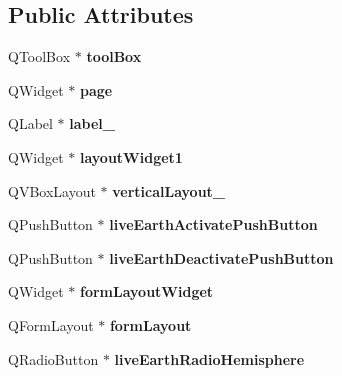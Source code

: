 \subsection*{Public Attributes}
\begin{DoxyCompactItemize}
\item 
\hypertarget{classUi__Extras_ab6d937b70fceb48a3e7eaa028b5af17a}{
QToolBox $\ast$ {\bfseries toolBox}}
\label{classUi__Extras_ab6d937b70fceb48a3e7eaa028b5af17a}

\item 
\hypertarget{classUi__Extras_a4f4b0eb303e7bd48ab30a1d3cd0e0b32}{
QWidget $\ast$ {\bfseries page}}
\label{classUi__Extras_a4f4b0eb303e7bd48ab30a1d3cd0e0b32}

\item 
\hypertarget{classUi__Extras_a0a5ec50ecaca1072b40e7857397ef890}{
QLabel $\ast$ {\bfseries label\_}}
\label{classUi__Extras_a0a5ec50ecaca1072b40e7857397ef890}

\item 
\hypertarget{classUi__Extras_afa6756d7678bcf68325320b8d0260551}{
QWidget $\ast$ {\bfseries layoutWidget1}}
\label{classUi__Extras_afa6756d7678bcf68325320b8d0260551}

\item 
\hypertarget{classUi__Extras_a20949d17f93ae9a7fd7a3f2cf309ccad}{
QVBoxLayout $\ast$ {\bfseries verticalLayout\_}}
\label{classUi__Extras_a20949d17f93ae9a7fd7a3f2cf309ccad}

\item 
\hypertarget{classUi__Extras_ac6fd999821ea077a5a9fb543acc16fd4}{
QPushButton $\ast$ {\bfseries liveEarthActivatePushButton}}
\label{classUi__Extras_ac6fd999821ea077a5a9fb543acc16fd4}

\item 
\hypertarget{classUi__Extras_a0591653135ec37cba2db9a7cebc06393}{
QPushButton $\ast$ {\bfseries liveEarthDeactivatePushButton}}
\label{classUi__Extras_a0591653135ec37cba2db9a7cebc06393}

\item 
\hypertarget{classUi__Extras_a4ad0a03d033f96f16367da8b3d8adf3e}{
QWidget $\ast$ {\bfseries formLayoutWidget}}
\label{classUi__Extras_a4ad0a03d033f96f16367da8b3d8adf3e}

\item 
\hypertarget{classUi__Extras_a82e2d79ca46ef7f7009de5b8364830ee}{
QFormLayout $\ast$ {\bfseries formLayout}}
\label{classUi__Extras_a82e2d79ca46ef7f7009de5b8364830ee}

\item 
\hypertarget{classUi__Extras_a610559fbdb9e6613573ed1f8a5b3e2db}{
QRadioButton $\ast$ {\bfseries liveEarthRadioHemisphere}}
\label{classUi__Extras_a610559fbdb9e6613573ed1f8a5b3e2db}


\end{DoxyCompactItemize}
